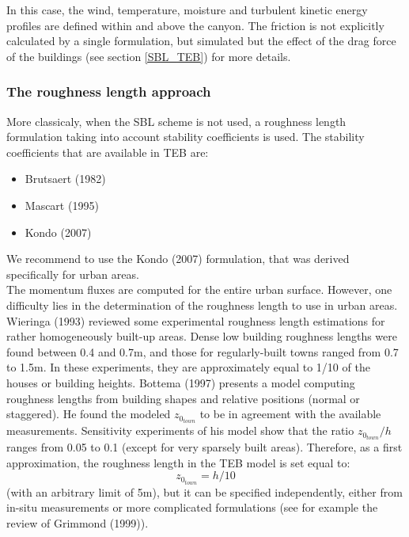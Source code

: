 In this case, the wind, temperature, moisture and turbulent kinetic energy profiles are defined within and above the canyon. The friction is not explicitly calculated by a single formulation, but simulated but the effect of the drag force of the buildings (see section \ref{SBL_TEB}) for more details.

\subsubsection{The roughness length approach}

More classicaly, when the SBL scheme is not used, a roughness length formulation taking into account stability coefficients is used.
The stability coefficients that are available in TEB are:
 \begin{itemize}
\item Brutsaert (1982) \nocite{Brutsaert1982}
\item Mascart \etal (1995)\nocite{Mascart1995}
\item Kondo \etal  (2007)\nocite{Kondo2007}
 \end{itemize}
 We recommend to use the Kondo \etal (2007) formulation, that was derived specifically for urban areas. \\

The momentum fluxes are computed for the entire urban surface.
However, one difficulty lies in the determination of the roughness length
to use in urban areas. Wieringa (1993) reviewed
some experimental roughness length estimations for rather
homogeneously built-up areas. Dense low building roughness lengths
were found between 0.4 and 0.7m, and those for 
regularly-built towns ranged from
0.7 to 1.5m. In these experiments, they are approximately equal to 1/10
of the houses or building heights. Bottema (1997)\nocite{Bottema1997} 
presents a model computing roughness lengths from building shapes and
relative positions (normal or staggered). He found the modeled
$z_{0_{town}}$ to be in agreement with the available measurements. Sensitivity
experiments of his model show that the ratio $z_{0_{town}}/h$ ranges from
0.05 to 0.1 (except for very sparsely built areas). Therefore, as a first
approximation, the roughness length in the TEB model is set equal to:
\begin{displaymath}
z_{0_{town}} = h/10
\end{displaymath}
(with an arbitrary limit of 5m), but it can be
specified independently, either from in-situ measurements
or more complicated formulations (see for example the review
of Grimmond (1999)\nocite{Grimmond1999}).

